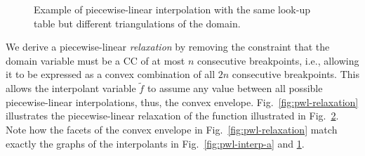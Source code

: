 \documentclass[pdflatex,sn-mathphys-num]{sn-jnl}%
\newcommand{\new}[1]{#1}
\begin{document}
\begin{figure}[h]
\begin{subfigure}[t]{0.49\textwidth}
    \caption{}\label{fig:pwl-interp-b}
    \end{subfigure}
    \caption{\new{Example of piecewise-linear interpolation with the same look-up table but different triangulations of the domain.}}
    \label{fig:piecewise-interp-example}
\end{figure}

\new{%
We derive a piecewise-linear \emph{relaxation} by removing the constraint that the domain variable must be a CC of at most $n$ consecutive breakpoints, i.e., allowing it to be expressed as a convex combination of all $2n$ consecutive breakpoints.
This allows the interpolant variable $\widetilde{f}$ to assume any value between all possible piecewise-linear interpolations, thus, the convex envelope.
Fig.~\ref{fig:pwl-relaxation} illustrates the piecewise-linear relaxation of the function illustrated in Fig.~\ref{fig:piecewise-interp-example}.
Note how the facets of the convex envelope in Fig.~\ref{fig:pwl-relaxation} match exactly the graphs of the interpolants in Fig.~\ref{fig:pwl-interp-a} and \ref{fig:pwl-interp-b}.
}
\end{document}
